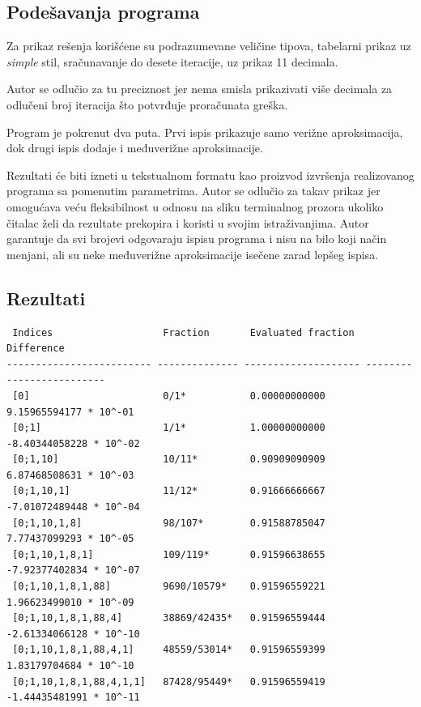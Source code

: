 \documentclass[a4paper,10pt]{article}
\begin{document}
\subsection{Podešavanja programa}
Za prikaz rešenja korišćene su podrazumevane veličine tipova, tabelarni prikaz uz \textit{simple} stil, sračunavanje do desete iteracije, uz prikaz 11 decimala. 

Autor se odlučio za tu preciznost jer nema smisla prikazivati više decimala za odlučeni broj iteracija što potvrđuje proračunata greška. 

\vspace{11pt}

Program je pokrenut dva puta. Prvi ispis prikazuje samo verižne aproksimacija, dok drugi ispis dodaje i međuverižne aproksimacije.

\vspace{11pt}

Rezultati će biti izneti u tekstualnom formatu kao proizvod izvršenja realizovanog programa sa pomenutim parametrima. Autor se odlučio za takav prikaz jer omogućava veću fleksibilnost u odnosu na sliku terminalnog prozora ukoliko čitalac želi da rezultate prekopira i koristi u svojim istraživanjima. Autor garantuje da svi brojevi odgovaraju ispisu programa i nisu na bilo koji način menjani, ali su neke međuverižne aproksimacije isečene zarad lepšeg ispisa.

\subsection{Rezultati}
\begin{verbatim}
 Indices                   Fraction       Evaluated fraction   Difference              
------------------------- -------------- -------------------- -------------------------
 [0]                       0/1*           0.00000000000         9.15965594177 * 10^-01 
 [0;1]                     1/1*           1.00000000000        -8.40344058228 * 10^-02 
 [0;1,10]                  10/11*         0.90909090909         6.87468508631 * 10^-03 
 [0;1,10,1]                11/12*         0.91666666667        -7.01072489448 * 10^-04 
 [0;1,10,1,8]              98/107*        0.91588785047         7.77437099293 * 10^-05 
 [0;1,10,1,8,1]            109/119*       0.91596638655        -7.92377402834 * 10^-07 
 [0;1,10,1,8,1,88]         9690/10579*    0.91596559221         1.96623499010 * 10^-09 
 [0;1,10,1,8,1,88,4]       38869/42435*   0.91596559444        -2.61334066128 * 10^-10 
 [0;1,10,1,8,1,88,4,1]     48559/53014*   0.91596559399         1.83179704684 * 10^-10 
 [0;1,10,1,8,1,88,4,1,1]   87428/95449*   0.91596559419        -1.44435481991 * 10^-11  
\end{verbatim}
\end{document}
